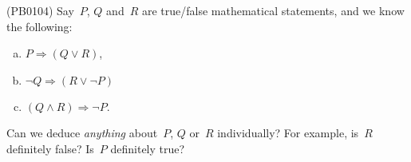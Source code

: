 (PB0104) Say~$P$, $Q$ and~$R$ are true/false mathematical statements, and we know the following:
\begin{enumerate}[(a)]
\item $P\Rightarrow(Q\vee R)$,
\item $\neg Q\Rightarrow (R\vee\neg P)$
\item $(Q\wedge R)\Rightarrow \neg P$.
\end{enumerate}
Can we deduce \emph{anything} about~$P$, $Q$ or~$R$ individually? For example, is~$R$ definitely false? Is~$P$ definitely true?


